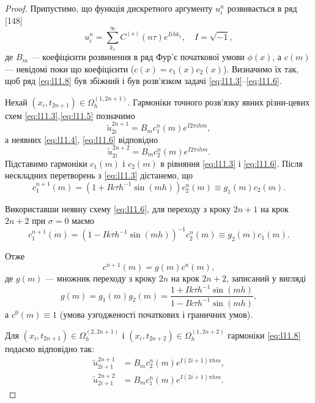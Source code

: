 \begin{proof}
    Припустимо, що функція дискретного аргументу $u_i^n$ розвивається в ряд [148]
    \begin{equation}
	    \label{eq:l11.8}
        u_i^n = \sum_{k_1}^\infty C^{(s)} (n \tau) e^{I i h k_1}, \quad I = \sqrt{-1},
    \end{equation}
    де $B_m$ --- коефіцієнти розвинення в ряд Фур'є початкової умови $\phi(x)$, а $c(m)$ --- невідомі поки що коефіцієнти ($c(x) = c_1(x) c_2(x)$). Визначимо їх так, щоб ряд \eqref{eq:l11.8} був збіжний і був розв'язком задачі \eqref{eq:l11.3}--\eqref{eq:l11.6}. \medskip
    
	Нехай $(x_i, t_{2n+1}) \in \Omega_h^{(1,2n+1)}$. Гармоніки точного розв'язку явних різни-цевих схем \eqref{eq:l11.3},\eqref{eq:l11.5} позначимо \[\tilde u_{2i}^{2n+1} = B_m c_1^n(m) e^{I2\pi ihm},\] а неявних \eqref{eq:l11.4}, \eqref{eq:l11.6} відповідно \[\tilde u_{2i}^{2n+2} = B_m c_2^n(m) e^{I2\pi ihm}.\] Підставимо гармоніки $c_1(m)$ і $c_2(m)$ в рівняння \eqref{eq:l11.3} і \eqref{eq:l11.6}. Після нескладних перетворень з \eqref{eq:l11.3} дістанемо, що
    \begin{equation}
	 	\label{eq:l11.9}
	 	c_1^{n+1}(m)=(1+Ik\tau h^{-1}\sin(mh)) c_2^n(m) \equiv g_1(m)c_2(m).
    \end{equation}

    Використавши неявну схему \eqref{eq:l11.6}, для переходу з кроку $2 n + 1$ на крок $2 n + 2$ при $\sigma = 0$  маємо
    \begin{equation}
	 	\label{eq:l11.10}
	 	c_1^{n+1}(m)=(1-Ik\tau h^{-1}\sin(mh))^{-1} c_2^n(m) \equiv g_2(m)c_1(m).
    \end{equation}

    Отже
    \begin{equation}
	    \label{eq:l11.11}
	    c^{n+1}(m) = g(m) c^n(m),
    \end{equation}
    де $g(m)$ --- множник переходу з кроку $2 n$ на крок $2 n + 2$, записаний у вигляді 
    \begin{equation}
	    \label{eq:l11.12}
	    g(m) = g_1(m) g_2(m) = \frac{1+Ik\tau h^{-1}\sin(mh)}{1-Ik\tau h^{-1}\sin(mh)},
    \end{equation}
    а $c^0(m) \equiv 1$ (умова узгодженості початкових і граничних умов). \medskip

    Для $(x_i,t_{2n+1}) \in \Omega_h^{(2,2n+1)}$ і $(x_i,t_{2n+2}) \in \Omega_h^{(1,2n+2)}$ гармоніки \eqref{eq:l11.8} подаємо відповідно так:
    \begin{align*}
        \tilde u_{2i+1}^{2n+1} &= B_m c_2^n(m) e^{I(2i+1)\pi hm}, \\
        \tilde u_{2i+1}^{2n+2} &= B_m c_1^n(m) e^{I(2i+1)\pi hm}.
    \end{align*}
    

\end{proof}

